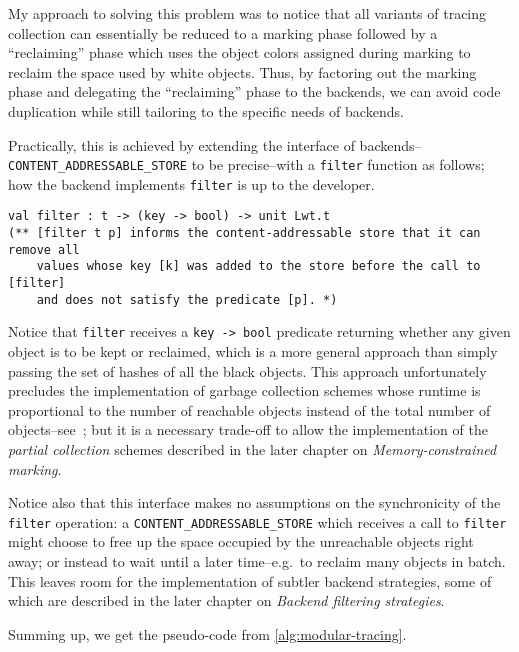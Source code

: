 My approach to solving this problem was to notice that all variants of tracing collection can essentially be reduced to a marking phase followed by a ``reclaiming'' phase which uses the object colors assigned during marking to reclaim the space used by white objects. Thus, by factoring out the marking phase and delegating the ``reclaiming'' phase to the backends, we can avoid code duplication while still tailoring to the specific needs of backends.

\bigskip
Practically, this is achieved by extending the interface of backends--\texttt{CONTENT\_ADDRESSABLE\_STORE} to be precise--with a \texttt{filter} function as follows; how the backend implements \texttt{filter} is up to the developer.

\vspace{.5em}
\begin{verbatim}
val filter : t -> (key -> bool) -> unit Lwt.t
(** [filter t p] informs the content-addressable store that it can remove all
    values whose key [k] was added to the store before the call to [filter]
    and does not satisfy the predicate [p]. *)
\end{verbatim}
\vspace{.5em}

Notice that \texttt{filter} receives a \texttt{key\ -\textgreater{}\ bool} predicate returning whether any given object is to be kept or reclaimed, which is a more general approach than simply passing the set of hashes of all the black objects. This approach unfortunately precludes the implementation of garbage collection schemes whose runtime is proportional to the number of reachable objects instead of the total number of objects--see~\cite{zorn90}; but it is a necessary trade-off to allow the implementation of the \emph{partial collection} schemes described in the later chapter on \emph{Memory-constrained marking}.

Notice also that this interface makes no assumptions on the synchronicity of the \texttt{filter} operation: a \texttt{CONTENT\_ADDRESSABLE\_STORE} which receives a call to \texttt{filter} might choose to free up the space occupied by the unreachable objects right away; or instead to wait until a later time--e.g.~to reclaim many objects in batch. This leaves room for the implementation of subtler backend strategies, some of which are described in the later chapter on \emph{Backend filtering strategies}.

Summing up, we get the pseudo-code from \cref{alg:modular-tracing}.

